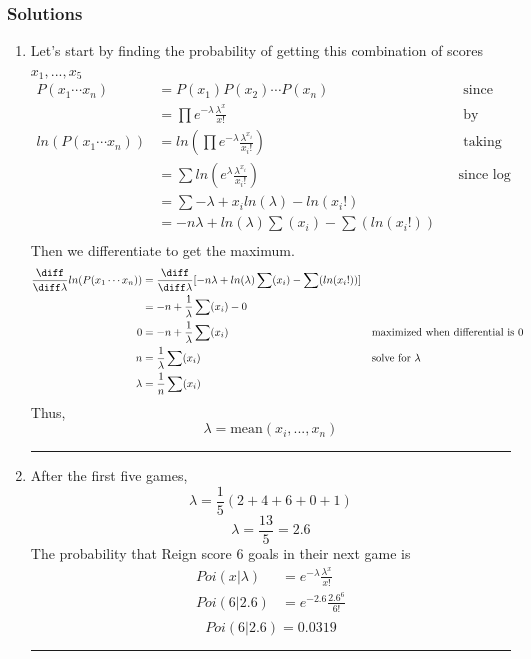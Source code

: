 \documentclass{article}
\begin{document}
\begin{aprob}
    \subsubsection*{Solutions}
    \begin{enumerate}
        \item Let's start by finding the probability of getting this combination of scores $x_1, ... , x_5$
        \begin{align*}
            P(x_1\cdots x_n) &= P(x_1)P(x_2)\cdots P(x_n) & &\text{ since scores are iid} \\
            &= \prod e^{-\lambda}\frac{\lambda^x}{x!} & &\text{ by definition} \\
            ln( P( x_1 \cdots x_n ) ) &= ln( \prod e^{-\lambda}\frac{\lambda^{x_i}}{x_i!} ) & &\text{ taking natural log of both sides}\\
            &= \sum ln( e^\lambda \frac{\lambda^{x_i}}{x_i!} ) & &\text{since log turns product to sum}\\
            &= \sum  -\lambda + x_i ln( \lambda ) - ln( x_i! )  \\
            &= -n \lambda + ln(\lambda) \sum ( x_i ) - \sum( ln(x_i!) ) \\
        \end{align*}
        Then we differentiate to get the maximum.
        \begin{align*}
            \frac{\diff}{\diff \lambda} ln( P( x_1 \cdots x_n ) ) &= \frac{\diff}{\diff \lambda} \lbrack -n \lambda + ln(\lambda) \sum ( x_i ) - \sum( ln(x_i!) ) \rbrack\\
            &= -n + \frac{1}{\lambda} \sum ( x_i )- 0 \\
            0 &= -n + \frac{1}{\lambda} \sum ( x_i ) & & \text{maximized when differential is 0}\\
            n &= \frac{1}{\lambda} \sum ( x_i ) & & \text{solve for }\lambda \\
            \lambda &= \frac{1}{n} \sum ( x_i ) \\
        \end{align*}
        Thus,
        $$ \boxed{\lambda =  \text{mean} (x_i, ... , x_n)} $$
        \rule{\textwidth}{0.25pt}
        \newpage

        \item After the first five games,
        \[ \lambda = \frac{1}{5} (2+4+6+0+1) \]
        $$ \boxed {\lambda = \frac{13}{5} = 2.6 }$$
        The probability that Reign score 6 goals in their next game is
        \begin{align*}
            Poi(x|\lambda) &= e^{-\lambda} \frac{\lambda^x}{x!} \\
            Poi(6|2.6) &= e^{-2.6} \frac{2.6^6}{6!} \\
        \end{align*}
        $$ \boxed { Poi(6|2.6) = 0.0319 } $$
        \rule{\textwidth}{0.25pt}
        \newpage


\end{enumerate}
\end{aprob}
\end{document}
